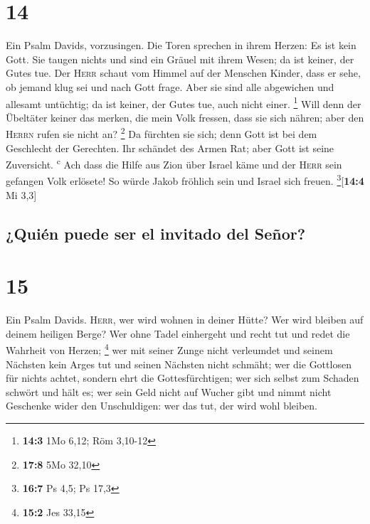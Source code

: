 \hypertarget{section-13}{%
\section{14}\label{section-13}}

 Ein Psalm Davids, vorzusingen. Die Toren sprechen in
ihrem Herzen: Es ist kein Gott. Sie taugen nichts und sind ein Gräuel
mit ihrem Wesen; da ist keiner, der Gutes tue.  Der
\textsc{Herr} schaut vom Himmel auf der Menschen Kinder, dass er sehe,
ob jemand klug sei und nach Gott frage.  Aber sie sind
alle abgewichen und allesamt untüchtig; da ist keiner, der Gutes tue,
auch nicht einer. \footnote{\textbf{14:3} 1Mo 6,12; Röm 3,10-12}
 Will denn der Übeltäter keiner das merken, die mein Volk
fressen, dass sie sich nähren; aber den \textsc{Herrn} rufen sie nicht
an? \footnote{\textbf{17:8} 5Mo 32,10}  Da fürchten sie
sich; denn Gott ist bei dem Geschlecht der Gerechten.  Ihr
schändet des Armen Rat; aber Gott ist seine Zuversicht.
\textsuperscript{c}  Ach dass die Hilfe aus Zion über
Israel käme und der \textsc{Herr} sein gefangen Volk erlösete! So würde
Jakob fröhlich sein und Israel sich freuen. \footnote{\textbf{16:7} Ps
  4,5; Ps 17,3}{[}\textbf{14:4} Mi 3,3{]}

\hypertarget{quiuxe9n-puede-ser-el-invitado-del-seuxf1or}{%
\subsection{¿Quién puede ser el invitado del
Señor?}\label{quiuxe9n-puede-ser-el-invitado-del-seuxf1or}}

\hypertarget{section-14}{%
\section{15}\label{section-14}}

 Ein Psalm Davids. \textsc{Herr}, wer wird wohnen in
deiner Hütte? Wer wird bleiben auf deinem heiligen Berge? 
Wer ohne Tadel einhergeht und recht tut und redet die Wahrheit von
Herzen; \footnote{\textbf{15:2} Jes 33,15}  wer mit seiner
Zunge nicht verleumdet und seinem Nächsten kein Arges tut und seinen
Nächsten nicht schmäht;  wer die Gottlosen für nichts
achtet, sondern ehrt die Gottesfürchtigen; wer sich selbst zum Schaden
schwört und hält es;  wer sein Geld nicht auf Wucher gibt
und nimmt nicht Geschenke wider den Unschuldigen: wer das tut, der wird
wohl bleiben.

